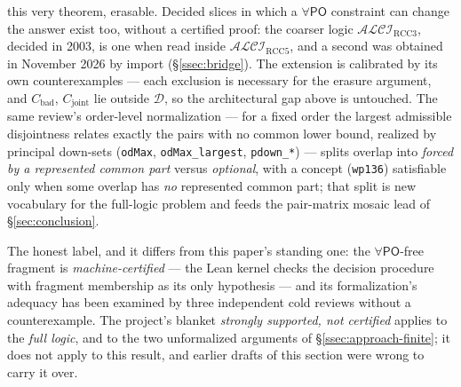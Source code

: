 \documentclass[11pt]{article}
\newcommand{\ALCIRCC}[1]{\mathcal{ALCI}_{\mathrm{RCC#1}}}
\newcommand{\PO}{\mathsf{PO}}
\newcommand{\code}[1]{\texttt{#1}}
\theoremstyle{plain}
\theoremstyle{definition}
\begin{document}
this very theorem, erasable. Decided slices in which a $\forall\PO$
constraint can change the answer exist too, without a certified proof: the
coarser logic $\ALCIRCC3$, decided in 2003, is one when read inside
$\ALCIRCC5$, and a second was obtained in November 2026 by import
(\S\ref{ssec:bridge}). The extension is
calibrated by its own counterexamples --- each exclusion is necessary for the
erasure argument, and $C_{\mathrm{bad}}$, $C_{\mathrm{joint}}$ lie outside
$\mathcal D$, so the architectural gap above is untouched. The same review's order-level
normalization --- for a fixed order the largest admissible disjointness
relates exactly the pairs with no common lower bound, realized by principal
down-sets (\code{odMax}, \code{odMax\_largest}, \code{pdown\_*}) --- splits
overlap into \emph{forced by a represented common part} versus
\emph{optional}, with a concept (\texttt{wp136}) satisfiable only when some
overlap has \emph{no} represented common part; that split is new vocabulary
for the full-logic problem and feeds the pair-matrix mosaic lead of
\S\ref{sec:conclusion}.

The honest label, and it differs from this paper's standing one: the
$\forall\PO$-free fragment is \emph{machine-certified} --- the Lean kernel
checks the decision procedure with fragment membership as its only hypothesis
--- and its formalization's adequacy has been examined by three independent
cold reviews without a counterexample. The project's blanket \emph{strongly
supported, not certified} applies to the \emph{full logic}, and to the two
unformalized arguments of \S\ref{ssec:approach-finite}; it does not apply to
this result, and earlier drafts of this section were wrong to carry it over.
\end{document}
